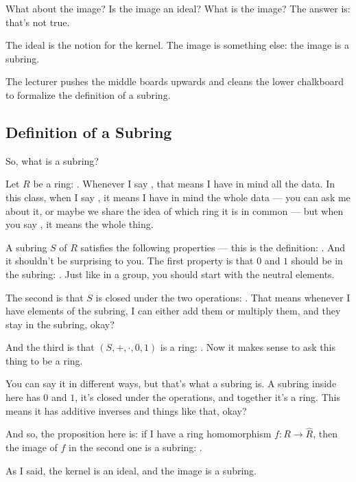 \begin{speech}[00:35:06 - 00:36:04]
What about the image? Is the image an ideal? What is the image? The answer is: that's not true.

The ideal is the notion for the kernel. The image is something else: the image is a subring.
\end{speech}

\begin{note}
The lecturer pushes the middle boards upwards and cleans the lower chalkboard to formalize the definition of a subring.
\end{note}

\subsection{Definition of a Subring}

\begin{speech}[00:36:04 - 00:38:17]
So, what is a subring?

Let $R$ be a ring: . Whenever I say , that means I have in mind all the data. In this class, when I say , it means I have in mind the whole data --- you can ask me about it, or maybe we share the idea of which ring it is in common --- but when you say , it means the whole thing.

A subring $S$ of $R$ satisfies the following properties --- this is the definition: . And it shouldn't be surprising to you. The first property is that $0$ and $1$ should be in the subring: . Just like in a group, you should start with the neutral elements.

The second is that $S$ is closed under the two operations: . That means whenever I have elements of the subring, I can either add them or multiply them, and they stay in the subring, okay?

And the third is that $(S, +, \cdot, 0, 1)$ is a ring: . Now it makes sense to ask this thing to be a ring.

You can say it in different ways, but that's what a subring is. A subring inside here has $0$ and $1$, it's closed under the operations, and together it's a ring. This means it has additive inverses and things like that, okay?

And so, the proposition here is:  if I have a ring homomorphism $f \colon R \to \hat{R}$,  then the image of $f$ in the second one is a subring: .

As I said, the kernel is an ideal, and the image is a subring.
\end{speech}

